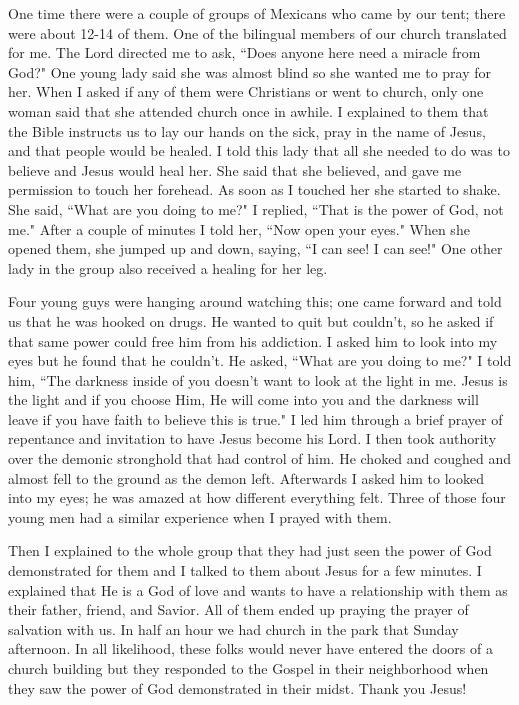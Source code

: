 \documentclass[oneside]{book}
\begin{document}
One time there were a couple of groups of Mexicans who came by our tent; there were about 12-14 of them. One of the bilingual members of our church translated for me. The Lord directed me to ask, ``Does anyone here need a miracle from God?" One young lady said she was almost blind so she wanted me to pray for her. When I asked if any of them were Christians or went to church, only one woman said that she attended church once in awhile. I explained to them that the Bible instructs us to lay our hands on the sick, pray in the name of Jesus, and that people would be healed. I told this lady that all she needed to do was to believe and Jesus would heal her. She said that she believed, and gave me permission to touch her forehead. As soon as I touched her she started to shake. She said, ``What are you doing to me?" I replied, ``That is the power of God, not me." After a couple of minutes I told her, ``Now open your eyes." When she opened them, she jumped up and down, saying, ``I can see! I can see!" One other lady in the group also received a healing for her leg. 

Four young guys were hanging around watching this; one came forward and told us that he was hooked on drugs. He wanted to quit but couldn't, so he asked if that same power could free him from his addiction. I asked him to look into my eyes but he found that he couldn't. He asked, ``What are you doing to me?" I told him, ``The darkness inside of you doesn't want to look at the light in me. Jesus is the light and if you choose Him, He will come into you and the darkness will leave if you have faith to believe this is true." I led him through a brief prayer of repentance and invitation to have Jesus become his Lord. I then took authority over the demonic stronghold that had control of him. He choked and coughed and almost fell to the ground as the demon left. Afterwards I asked him to looked into my eyes; he was amazed at how different everything felt. Three of those four young men had a similar experience when I prayed with them.

Then I explained to the whole group that they had just seen the power of God demonstrated for them and I talked to them about Jesus for a few minutes. I explained that He is a God of love and wants to have a relationship with them as their father, friend, and Savior. All of them ended up praying the prayer of salvation with us. In half an hour we had church in the park that Sunday afternoon. In all likelihood, these folks would never have entered the doors of a church building but they responded to the Gospel in their neighborhood when they saw the power of God demonstrated in their midst. Thank you Jesus!
\end{document}

